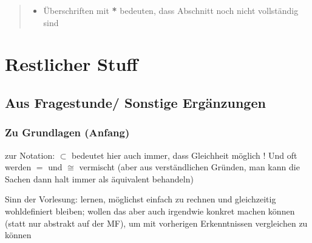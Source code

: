 \begin{abstract}
\begin{itemize}
\item Überschriften mit \textbf{*} bedeuten, dass Abschnitt noch nicht vollständig sind
\end{itemize}
\end{abstract}


\newpage


{
\hypersetup{linkcolor=black}
\tableofcontents
}

\newpage

{
\hypersetup{linkcolor=black}
\listoffigures
}

\newpage



\pagestyle{scrheadings}



















\chapter{Restlicher Stuff}


	\section{Aus Fragestunde/ Sonstige Ergänzungen}
		\subsection*{Zu Grundlagen (Anfang)}
zur Notation: $\subset$ bedeutet hier auch immer, dass Gleichheit möglich ! Und oft werden $=$ und $\cong$ vermischt (aber aus verständlichen Gründen, man kann die Sachen dann halt immer als äquivalent behandeln)

Sinn der Vorlesung: lernen, möglichst einfach zu rechnen und gleichzeitig wohldefiniert bleiben; wollen das aber auch irgendwie konkret machen können (statt nur abstrakt auf der MF), um mit vorherigen Erkenntnissen vergleichen zu können


